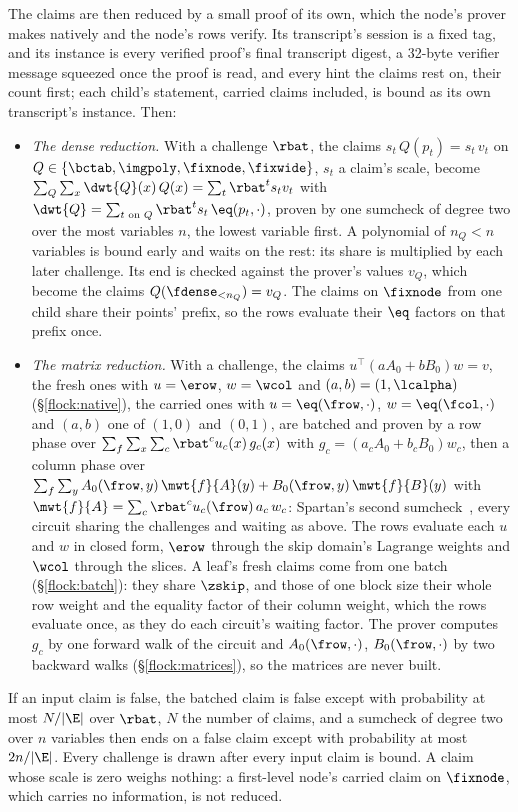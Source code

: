 The claims are then reduced by a small proof of its own, which the node's prover makes natively and the node's rows verify. Its transcript's session is a fixed tag, and its instance is every verified proof's final transcript digest, a 32-byte verifier message squeezed once the proof is read, and every hint the claims rest on, their count first; each child's statement, carried claims included, is bound as its own transcript's instance. Then:
\begin{itemize}[itemsep=1pt,topsep=3pt]
\item \emph{The dense reduction.} With a challenge $\rbat$, the claims $s_t\,Q(p_t)=s_t\,v_t$ on $Q\in\{\bctab,\imgpoly,\fixnode,\fixwide\}$, $s_t$ a claim's scale, become $\sum_Q\sum_x\dwt{Q}(x)\,Q(x)=\sum_t\rbat^t s_tv_t$ with $\dwt{Q}=\sum_{t\text{ on }Q}\rbat^t s_t\,\eq(p_t,\cdot)$, proven by one sumcheck of degree two over the most variables $n$, the lowest variable first. A polynomial of $n_Q<n$ variables is bound early and waits on the rest: its share is multiplied by each later challenge. Its end is checked against the prover's values $v_Q$, which become the claims $Q({\fdense}_{<n_Q})=v_Q$. The claims on $\fixnode$ from one child share their points' prefix, so the rows evaluate their $\eq$ factors on that prefix once.
\item \emph{The matrix reduction.} With a challenge, the claims $u^{\top}(aA_0+bB_0)w=v$, the fresh ones with $u=\erow$, $w=\wcol$ and $(a,b)=(1,\lcalpha)$ (\S\ref{flock:native}), the carried ones with $u=\eq(\frow,\cdot)$, $w=\eq(\fcol,\cdot)$ and $(a,b)$ one of $(1,0)$ and $(0,1)$, are batched and proven by a row phase over $\sum_f\sum_x\sum_c\rbat^cu_c(x)\,g_c(x)$ with $g_c=(a_cA_0+b_cB_0)w_c$, then a column phase over $\sum_f\sum_y A_0(\frow,y)\,\mwt{f}{A}(y)+B_0(\frow,y)\,\mwt{f}{B}(y)$ with $\mwt{f}{A}=\sum_c\rbat^cu_c(\frow)\,a_c\,w_c$: Spartan's second sumcheck~\cite{Set20}, every circuit sharing the challenges and waiting as above. The rows evaluate each $u$ and $w$ in closed form, $\erow$ through the skip domain's Lagrange weights and $\wcol$ through the slices. A leaf's fresh claims come from one batch (\S\ref{flock:batch}): they share $\zskip$, and those of one block size their whole row weight and the equality factor of their column weight, which the rows evaluate once, as they do each circuit's waiting factor. The prover computes $g_c$ by one forward walk of the circuit and $A_0(\frow,\cdot)$, $B_0(\frow,\cdot)$ by two backward walks (\S\ref{flock:matrices}), so the matrices are never built.
\end{itemize}
If an input claim is false, the batched claim is false except with probability at most $N/|\E|$ over $\rbat$, $N$ the number of claims, and a sumcheck of degree two over $n$ variables then ends on a false claim except with probability at most $2n/|\E|$. Every challenge is drawn after every input claim is bound. A claim whose scale is zero weighs nothing: a first-level node's carried claim on $\fixnode$, which carries no information, is not reduced.

